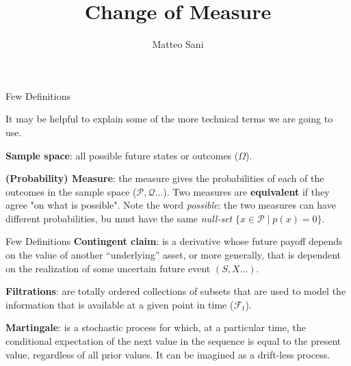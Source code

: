 \documentclass{beamer}
\title{Change of Measure}
\author{Matteo Sani}
\begin{document}
	\begin{frame}[plain]
		\maketitle
	\end{frame}

\begin{frame}{Few Definitions}


It may be helpful to explain some of the more technical terms we are going to use.\newline

\textbf{Sample space}: all possible future states or outcomes ($\Omega$).\newline

\textbf{(Probability) Measure}: the measure gives the probabilities of each of the outcomes in the sample space ($\mathcal{P}, \mathcal{Q}\ldots$). Two measures are \textbf{equivalent} if they agree "on what is possible". Note the word \emph{possible}: the two measures can have different probabilities, bu must have the same \emph{null-set} $\{x\in {\mathcal {P}}\mid p (x)=0\}$. 
\end{frame}

\begin{frame}{Few Definitions}
\textbf{Contingent claim}: is a derivative whose future payoff depends on the value of another “underlying” asset, or more generally, that is dependent on the realization of some uncertain future event $(S, X\ldots)$.\newline

\textbf{Filtrations}: are totally ordered collections of subsets that are used to model the information that is available at a given point in time ($\mathcal{F}_t$). \newline

\textbf{Martingale}: is a stochastic process for which, at a particular time, the conditional expectation of the next value in the sequence is equal to the present value, regardless of all prior values. It can be imagined as a drift-less process.
\end{frame}
\end{document}

